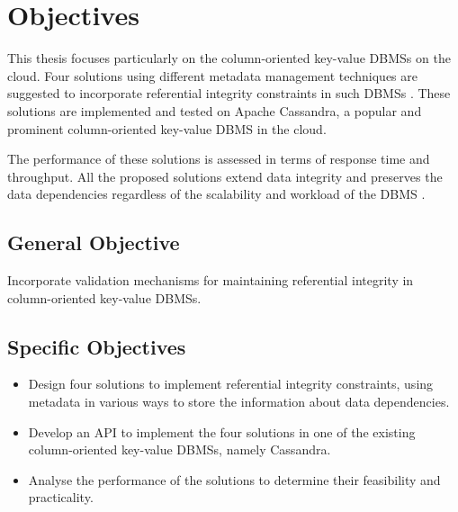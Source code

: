 \section{Objectives} 

This thesis  focuses particularly on the column-oriented
key-value \acp{DBMS}  on the cloud.  Four  solutions 
using different metadata management techniques are suggested to incorporate
referential integrity constraints in such \acp{DBMS} .  These
solutions are implemented and tested on Apache Cassandra, a popular and
prominent column-oriented key-value \ac{DBMS}  in the cloud. 

The performance of these solutions is assessed  in terms of response time and
throughput.  All the proposed solutions extend data integrity
and  preserves the data dependencies regardless of the scalability and workload
of the \ac{DBMS} . 

\subsection{General Objective}
 Incorporate validation mechanisms for maintaining referential integrity in
 column-oriented key-value \acp{DBMS}.

\subsection{Specific Objectives}
\begin{itemize} 
  \item Design four solutions to implement referential integrity constraints,
  using metadata in various ways to store the information about data
  dependencies. 
  \item Develop an \ac{API}  to implement the four solutions in one of the
  existing column-oriented key-value \acp{DBMS}, namely Cassandra.  
  \item Analyse the performance of the solutions to determine their
   feasibility and practicality. 
\end{itemize} 


